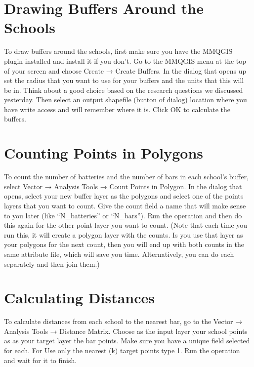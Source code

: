 \documentclass[]{book}
\begin{document}
\hypertarget{drawing-buffers-around-the-schools}{%
\section{Drawing Buffers Around the Schools}\label{drawing-buffers-around-the-schools}}

To draw buffers around the schools, first make sure you have the MMQGIS plugin installed and install it if you don't. Go to the MMQGIS menu at the top of your screen and choose Create → Create Buffers. In the dialog that opens up set the radius that you want to use for your buffers and the units that this will be in. Think about a good choice based on the research questions we discussed yesterday. Then select an output shapefile (button of dialog) location where you have write access and will remember where it is. Click OK to calculate the buffers.

\hypertarget{counting-points-in-polygons}{%
\section{Counting Points in Polygons}\label{counting-points-in-polygons}}

To count the number of batteries and the number of bars in each school's buffer, select Vector → Analysis Tools → Count Points in Polygon. In the dialog that opens, select your new buffer layer as the polygons and select one of the points layers that you want to count. Give the count field a name that will make sense to you later (like ``N\_batteries'' or ``N\_bars''). Run the operation and then do this again for the other point layer you want to count. (Note that each time you run this, it will create a polygon layer with the counts. Is you use that layer as your polygons for the next count, then you will end up with both counts in the same attribute file, which will save you time. Alternatively, you can do each separately and then join them.)

\hypertarget{calculating-distances}{%
\section{Calculating Distances}\label{calculating-distances}}

To calculate distances from each school to the nearest bar, go to the Vector → Analysis Tools → Distance Matrix. Choose as the input layer your school points as as your target layer the bar points. Make sure you have a unique field selected for each. For Use only the nearest (k) target points type 1. Run the operation and wait for it to finish.
\end{document}
